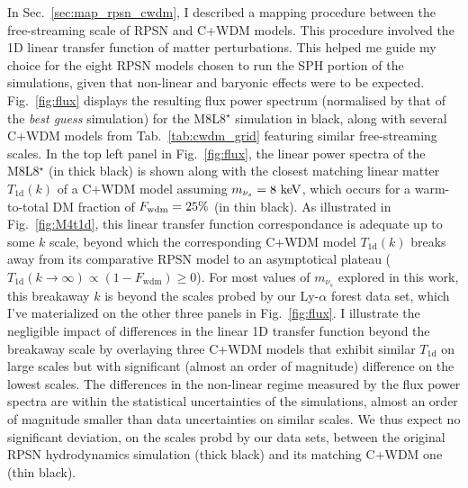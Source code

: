 In Sec.~\ref{sec:map_rpsn_cwdm}, I described a mapping procedure between the free-streaming scale of RPSN and C+WDM models. This procedure involved the 1D linear transfer function of matter perturbations. This helped me guide my choice for the eight RPSN models chosen to run the SPH portion of the simulations, given that non-linear and baryonic effects were to be expected. Fig.~\ref{fig:flux} displays the resulting flux power spectrum (normalised by that of the \emph{best guess} simulation) for the M8L8$^{\star}$ simulation in black, along with several C+WDM models from Tab.~\ref{tab:cwdm_grid} featuring similar free-streaming scales. In the top left panel in Fig.~\ref{fig:flux}, the linear power spectra of the M8L8$^\star$ (in thick black) is shown along with the closest matching linear matter $T_{\mathrm{1d}}(k)$ of a C+WDM model assuming $m_{\nu_s} = 8~\rm{keV}$, which occurs for a warm-to-total DM fraction of $F_{\rm{wdm}} = 25\%$ (in thin black). As illustrated in Fig.~\ref{fig:M4t1d}, this linear transfer function correspondance is adequate up to some $k$ scale, beyond which the corresponding C+WDM model $T_{\mathrm{1d}}(k)$ breaks away from its comparative RPSN model to an asymptotical plateau ($T_{\mathrm{1d}}(k \rightarrow \infty) \propto (1-F_{\mathrm{wdm}}) \geqslant 0$). For most values of $m_{\nu_s}$ explored in this work, this breakaway $k$ is beyond the scales probed by our Ly-$\alpha$ forest data set, which I've materialized on the other three panels in Fig.~\ref{fig:flux}. I illustrate the negligible impact of differences in the linear 1D transfer function beyond the breakaway scale by overlaying three C+WDM models that exhibit similar $T_{\mathrm{1d}}$ on large scales but with significant (almost an order of magnitude) difference on the lowest scales.  The differences in the non-linear regime measured by the flux power spectra are within the statistical uncertainties of the simulations, almost an order of magnitude smaller than data uncertainties on similar scales. We thus expect no significant deviation, on the scales probd by our data sets, between the original RPSN hydrodynamics simulation (thick black) and its matching C+WDM one (thin black).\\


